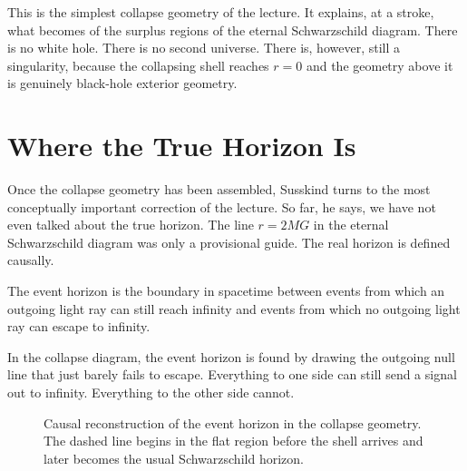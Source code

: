 This is the simplest collapse geometry of the lecture. It explains, at a stroke, what becomes of the surplus regions of the eternal Schwarzschild diagram. There is no white hole. There is no second universe. There is, however, still a singularity, because the collapsing shell reaches \(r=0\) and the geometry above it is genuinely black-hole exterior geometry.

\section{Where the True Horizon Is}

Once the collapse geometry has been assembled, Susskind turns to the most conceptually important correction of the lecture. So far, he says, we have not even talked about the true horizon. The line \(r=2MG\) in the eternal Schwarzschild diagram was only a provisional guide. The real horizon is defined causally.

\begin{definition}
The event horizon is the boundary in spacetime between events from which an outgoing light ray can still reach infinity and events from which no outgoing light ray can escape to infinity.
\end{definition}

In the collapse diagram, the event horizon is found by drawing the outgoing null line that just barely fails to escape. Everything to one side can still send a signal out to infinity. Everything to the other side cannot.

\begin{figure}[ht]
\centering
{}
\caption{Causal reconstruction of the event horizon in the collapse geometry. The dashed line begins in the flat region before the shell arrives and later becomes the usual Schwarzschild horizon.}
\end{figure}

